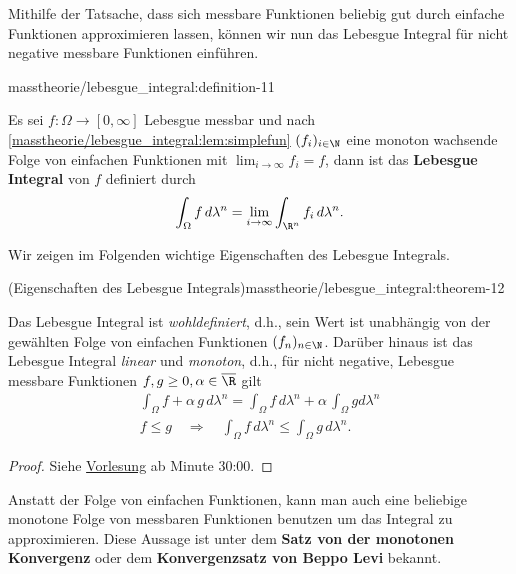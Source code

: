 \documentclass[letterpaper,10pt,german]{jupyterBook}
\begin{document}
\par
Mithilfe der Tatsache, dass sich messbare Funktionen beliebig gut durch einfache Funktionen approximieren lassen, können wir nun das Lebesgue Integral für nicht negative messbare Funktionen einführen.
\begin{definition}{}{masstheorie/lebesgue_integral:definition-11}



\par
Es sei \(f:\Omega\to[0,\infty]\) Lebesgue messbar und nach \cref{masstheorie/lebesgue_integral:lem:simplefun} \((f_i)_{i\in\N}\) eine monoton wachsende Folge von einfachen Funktionen mit \(\lim_{i\to\infty} f_i = f\), dann ist das \textbf{Lebesgue Integral} von \(f\) definiert durch
\begin{align*}
\int_{\Omega} f \,d\lambda^n = \lim_{i\rightarrow \infty} \int_{\R^n} f_i \,d\lambda^n.
\end{align*}\end{definition}

\par
Wir zeigen im Folgenden wichtige Eigenschaften des Lebesgue Integrals.
\begin{theorem}{(Eigenschaften des Lebesgue Integrals)}{masstheorie/lebesgue_integral:theorem-12}



\par
Das Lebesgue Integral ist \emph{wohldefiniert}, d.h., sein Wert ist unabhängig von der gewählten Folge von einfachen Funktionen \((f_n)_{n\in\N}\).
Darüber hinaus ist das Lebesgue Integral \emph{linear} und \emph{monoton}, d.h., für nicht negative, Lebesgue messbare Funktionen \(f,g \geq 0,\alpha\in\overline{\R}\) gilt
\begin{align*}
\int_\Omega f+\alpha\,g\,d\lambda^n = \int_\Omega f\,d\lambda^n + \alpha\, \int_\Omega g d\lambda^n\\
f \leq g \quad \Rightarrow \quad \int_\Omega f\, d\lambda^n \leq \int_\Omega g\, d\lambda^n.
\end{align*}\end{theorem}

\begin{proof}
 Siehe \href{https://www.fau.tv/clip/id/40589}{Vorlesung} ab Minute 30:00.
\end{proof}

\par
Anstatt der Folge von einfachen Funktionen, kann man auch eine beliebige monotone Folge von messbaren Funktionen benutzen um das Integral zu approximieren. Diese Aussage ist unter dem \textbf{Satz von der monotonen Konvergenz} oder dem \textbf{Konvergenzsatz von Beppo Levi} bekannt.
\end{document}

